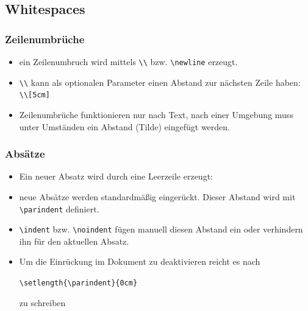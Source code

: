 \subsection{Whitespaces}

\begin{frame}[fragile]
\frametitle{Zeilenumbrüche}
\begin{itemize}[<+->]
  \item ein Zeilenumbruch wird mittels \lstinline[style=Latex]+\\+ bzw. \lstinline[style=Latex]+\newline+ erzeugt.
  \item \lstinline[style=Latex]+\\+ kann als optionalen Parameter einen Abstand zur nächsten Zeile haben:\\
    \lstinline[style=Latex]+\\[5cm]+
  \item Zeilenumbrüche funktionieren nur nach Text, nach einer Umgebung muss unter Umständen ein Abstand (Tilde) eingefügt werden.
\end{itemize}
\end{frame}

\begin{frame}[fragile]
\frametitle{Absätze}
\begin{itemize}[<+->]
  \item Ein neuer Absatz wird durch eine Leerzeile erzeugt:
  \item neue Absätze werden standardmäßig eingerückt. Dieser Abstand wird mit \lstinline[style=Latex]+\parindent+ definiert.
  \item \lstinline[style=Latex]+\indent+ bzw. \lstinline[style=Latex]+\noindent+ fügen manuell diesen Abstand ein oder verhindern ihn für den aktuellen Absatz.
  \item Um die Einrückung im Dokument zu deaktivieren reicht es nach \lstinline[style=Latex]++
\begin{center}
    \lstinline[style=Latex]+\setlength{\parindent}{0cm}+ 
\end{center}
zu schreiben
\end{itemize}
\end{frame}

